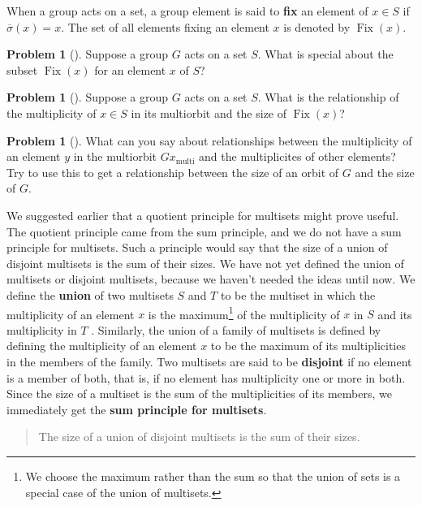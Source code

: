 \documentclass[10pt,]{book}
\newcommand{\terminology}[1]{\textbf{#1}}
\theoremstyle{plain}
\theoremstyle{definition}
\newtheorem{activity}[project]{Problem}
\theoremstyle{definition}
\numberwithin{equation}{chapter}
\DeclareMathOperator{\Fix}{Fix}
\begin{document}
When a group acts on a set, a group element is said to \terminology{fix} an element of \(x \in S\) if \(\overline{\sigma}(x) = x\). The set of all elements fixing an element \(x\) is denoted by \(\Fix(x)\).%
\begin{activity}[]\marginsymbol[-1em]{} \label{activity-293}
Suppose a group \(G\) acts on a set \(S\). What is special about the subset \(\Fix(x)\) for an element \(x\) of \(S\)?%
\end{activity}
\begin{activity}[] \label{activity-294}
Suppose a group \(G\) acts on a set \(S\). What is the relationship of the multiplicity of \(x\in S\) in its multiorbit and the size of \(\Fix(x)\)?%
\end{activity}
\begin{activity}[]\marginsymbol[-1em]{} \label{activity-295}
What can you say about relationships between the multiplicity of an element \(y\) in the multiorbit \(Gx_{\text{multi}}\) and the multiplicites of other elements? Try to use this to get a relationship between the size of an orbit of \(G\) and the size of \(G\).%
\end{activity}
We suggested earlier that a quotient principle for multisets might prove useful. The quotient principle came from the sum principle, and we do not have a sum principle for multisets. Such a principle would say that the size of a union of disjoint multisets is the sum of their sizes. We have not yet defined the union of multisets or disjoint multisets, because we haven't needed the ideas until now. We define the \terminology{union} of two multisets \(S\) and \(T\) to be the multiset in which the multiplicity of an element \(x\) is the maximum\footnote{We choose the maximum rather than the sum so that the union of sets is a special case of the union of multisets.\label{fn-23}} of the multiplicity of \(x\) in \(S\) and its multiplicity in \(T\) . Similarly, the union of a family of multisets is defined by defining the multiplicity of an element \(x\) to be the maximum of its multiplicities in the members of the family. Two multisets are said to be \terminology{disjoint} if no element is a member of both, that is, if no element has multiplicity one or more in both. Since the size of a multiset is the sum of the multiplicities of its members, we immediately get the \terminology{sum principle for multisets}.%
\begin{quote}\hypertarget{blockquote-14}{}
The size of a union of disjoint multisets is the sum of their sizes. %
\end{quote}
\end{document}
